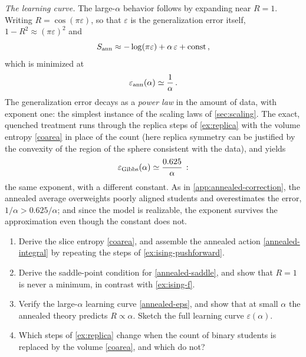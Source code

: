 \documentclass[11pt]{article}
\begin{document}
\emph{The learning curve.} The large-$\alpha$ behavior follows by expanding near $R=1$. Writing $R = \cos(\pi\varepsilon)$, so that $\varepsilon$ is the generalization error itself, $1-R^2\approx(\pi\varepsilon)^2$ and
%
\begin{equation}
    S_{\rm ann}\approx -\log(\pi\varepsilon) + \alpha\,\varepsilon + \text{const}\,, \label{Gann-large-alpha}
\end{equation}
%
which is minimized at
%
\begin{equation}
    \varepsilon_{\rm ann}(\alpha) \simeq \frac{1}{\alpha}\,. \label{annealed-eps}
\end{equation}
%
The generalization error decays as a \emph{power law} in the amount of data, with exponent one: the simplest instance of the scaling laws of \cref{sec:scaling}. The exact, quenched treatment \cite{seung1992statistical,engel2001statistical} runs through the replica steps of \cref{ex:replica} with the volume entropy \eqref{coarea} in place of the count (here replica symmetry can be justified by the convexity of the region of the sphere consistent with the data), and yields
%
\begin{equation}
    \varepsilon_{\rm Gibbs}(\alpha)\simeq\frac{0.625}{\alpha}\,: \label{quenched-eps}
\end{equation}
%
the same exponent, with a different constant. As in \cref{app:annealed-correction}, the annealed average overweights poorly aligned students and overestimates the error, $1/\alpha>0.625/\alpha$; and since the model is realizable, the exponent survives the approximation even though the constant does not.

\begin{exercise}
\label{ex:annealed}
\begin{enumerate}
  \item Derive the slice entropy \eqref{coarea}, and assemble the annealed action \eqref{annealed-integral} by repeating the steps of \cref{ex:ising-pushforward}.
  \item Derive the saddle-point condition for \eqref{annealed-saddle}, and show that $R=1$ is never a minimum, in contrast with \cref{ex:ising-f}.
  \item Verify the large-$\alpha$ learning curve \eqref{annealed-eps}, and show that at small $\alpha$ the annealed theory predicts $R\propto\alpha$. Sketch the full learning curve $\varepsilon(\alpha)$.
  \item Which steps of \cref{ex:replica} change when the count of binary students is replaced by the volume \eqref{coarea}, and which do not?
\end{enumerate}
\end{exercise}
\end{document}
